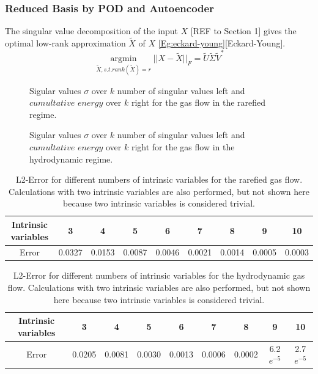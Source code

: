 \documentclass[12pt, a4paper]{article}
\begin{document}
\subsubsection{Reduced Basis by POD and Autoencoder}
The singular value decomposition of the input $X$ [REF to Section 1] gives the optimal low-rank approximation $\tilde{X}$ of $X$ \cref{Eg:eckard-young}[Eckard-Young].
\begin{equation}[!htbp]
\underset{\tilde{X}, s.t. rank(\tilde{X})=r}{\operatorname{argmin}} || X -\tilde{X} ||_F=\tilde{U}\tilde{\Sigma}\tilde{V}^*
\label{Eg:eckard-young}
\end{equation} 
\begin{figure}[!htbp]
	
	\label{Fig:CumSum_Rare}
	\caption{Sigular values \(\sigma\) over \(k\) number of singular values left and \(cumultative\) \(energy\) over \(k\) right for the gas flow in the rarefied regime.}
\end{figure}
\begin{figure}[!htbp]
	
	\label{Fig:CumSum_Hydro}
	\caption{Sigular values \(\sigma\) over \(k\) number of singular values left and \(cumultative\) \(energy\) over \(k\) right for the gas flow in the hydrodynamic regime.}
\end{figure}
\begin{table}[!htbp]\centering
\begin{tabular}{ |c|c|c|c|c|c|c|c|c| }
	\hline
	Intrinsic variables  & 3 & 4 & 5 & 6 & 7 & 8 & 9 & 10 \\ %
	\hline
	Error & 0.0327 & 0.0153 & 0.0087 & 0.0046 & 0.0021 & 0.0014 & 0.0005 & 0.0003\\ \hline
\end{tabular}
\caption{L2-Error for different numbers of intrinsic variables for the rarefied gas flow. Calculations with two intrinsic variables are also performed, but not shown here because two intrinsic variables is considered trivial.}
\label{Tab:Intrinsic units svd rare}
\end{table}
\begin{table}[!htbp]\centering
	\begin{tabular}{ |c|c|c|c|c|c|c|c|c| }
		\hline
		Intrinsic variables  & 3 & 4 & 5 & 6 & 7 & 8 & 9 & 10 \\ %
		\hline
		Error & 0.0205 & 0.0081 & 0.0030 & 0.0013 & 0.0006 & 0.0002 & 6.2\(e^{-5}\) & 2.7\(e^{-5}\)\\ \hline
	\end{tabular}
	\caption{L2-Error for different numbers of intrinsic variables for the hydrodynamic gas flow. Calculations with two intrinsic variables are also performed, but not shown here because two intrinsic variables is considered trivial.}
	\label{Tab:Intrinsic units svd hydro}
\end{table}
\end{document}
